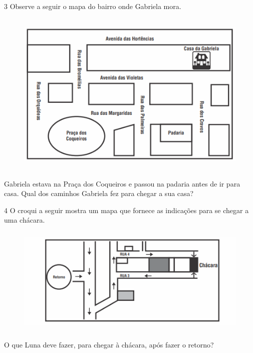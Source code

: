 
\num{3}  Observe a seguir o mapa do bairro onde Gabriela mora.

\begin{figure}[H]
\centering\includegraphics[width=4.95347in,height=3.13958in]{./imgSAEB_6_MAT/media/image66.png}
\end{figure}

Gabriela estava na Praça dos Coqueiros e passou na padaria antes de ir
para casa. Qual dos caminhos Gabriela fez para chegar a sua casa?


\num{4}  O croqui a seguir mostra um mapa que fornece as indicações para se
chegar a uma chácara.

\begin{figure}[H]
\centering\includegraphics[width=4.95347in,height=2.04653in]{./imgSAEB_6_MAT/media/image67.png}
\end{figure}

O que Luna deve fazer, para chegar à chácara, após fazer o retorno?


